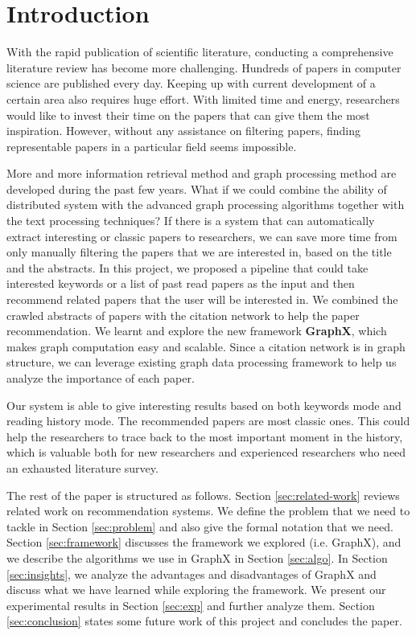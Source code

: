\section{Introduction}
%
With the rapid publication of scientific literature, conducting a comprehensive literature review has become more challenging.
Hundreds of papers in computer science are published every day.
%
Keeping up with current development of a certain area also requires huge effort.
%
With limited time and energy, researchers would like to invest their time on the papers that can give them the most inspiration.
%
However, without any assistance on filtering papers, finding representable papers in a particular field seems impossible.

%
More and more information retrieval method and graph processing method are developed during the past few years. 
What if we could combine the ability of distributed system with the advanced graph processing algorithms together with the text processing techniques?
If there is a system that can automatically extract interesting or classic papers to researchers, we can save more time from only manually filtering the papers that we are interested in, based on the title and the abstracts.
In this project, we proposed a pipeline that could take interested keywords or a list of past read papers as the input and then recommend related papers that the user will be interested in.
We combined the crawled abstracts of papers with the citation network to help the paper recommendation. We learnt and explore the new framework \textbf{GraphX}, which makes graph computation easy and scalable.
Since a citation network is in graph structure, we can leverage existing graph data processing framework to help us analyze the importance of each paper.

Our system is able to give interesting results based on both keywords mode and reading history mode. The recommended papers are most classic ones. This could help the researchers to trace back to the most important moment in the history, which is valuable both for new researchers and experienced researchers who need an exhausted literature survey.

The rest of the paper is structured as follows. 
%
Section \ref{sec:related-work} reviews related work on recommendation systems. 
%
We define the problem that we need to tackle in Section \ref{sec:problem} and also give the formal notation that we need.
%
Section \ref{sec:framework} discusses the framework we explored (i.e. GraphX), and we describe the algorithms we use in GraphX in Section \ref{sec:algo}.
%
In Section \ref{sec:insights}, we analyze the advantages and disadvantages of GraphX and discuss what we have learned while exploring the framework.
%
We present our experimental results in Section \ref{sec:exp} and further analyze them.
%
Section \ref{sec:conclusion} states some future work of this project and concludes the paper.
